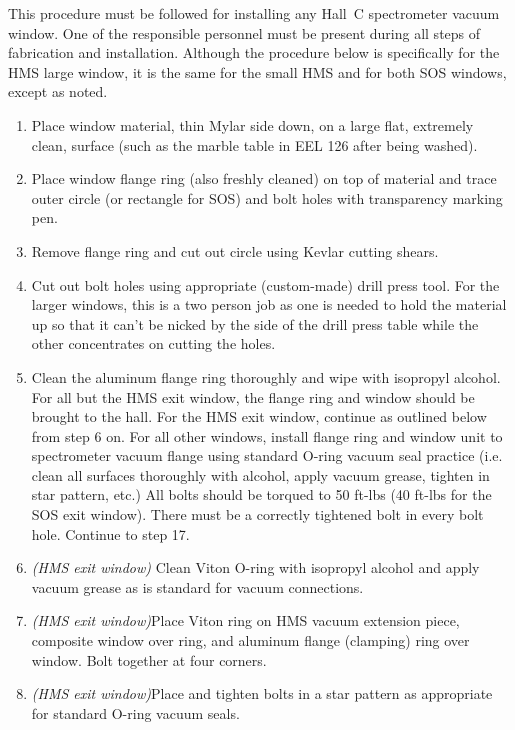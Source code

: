 {{This procedure must be followed for installing any Hall~C spectrometer
vacuum window. One of the responsible personnel must be present during
all steps of fabrication and installation.
Although the procedure below is specifically for
the HMS large window, it is the same for the small HMS and for both SOS windows,
except as noted.
\begin{enumerate}
\item{Place window material, thin Mylar side down,
on a large flat, extremely clean, surface (such as
the marble table in EEL 126 after being washed).}

\item{Place window flange ring (also freshly cleaned) on top of material
and trace outer
circle (or rectangle for SOS) and bolt holes with transparency marking
pen.}

\item{Remove flange ring and cut out circle using Kevlar cutting 
shears.}

\item{Cut out bolt holes using appropriate (custom-made) drill press tool.
For the larger windows, this is a two person job as one is needed to hold the
material up so that it can't be nicked by the side of the drill press table
while the other concentrates on cutting the holes.}

\item{Clean the aluminum flange ring thoroughly and wipe with isopropyl
alcohol. For all but the HMS exit window, the flange ring and
window should be brought to the hall.  For the HMS exit window,
continue as outlined below from step 6 on.  For all other windows,
install flange ring and window unit to spectrometer vacuum flange
using standard O-ring vacuum seal practice (i.e. clean all surfaces
thoroughly with alcohol, apply vacuum grease, tighten in star pattern,
etc.)  All bolts should be torqued to 50 ft-lbs (40 ft-lbs for the
SOS exit window).  There must be a correctly tightened bolt in every
bolt hole.  Continue to step 17.}

\item{{\sl (HMS exit window)} Clean Viton O-ring with isopropyl alcohol and apply vacuum
grease as is standard for vacuum connections.}

\item{{\sl (HMS exit window)}Place Viton ring on HMS vacuum extension piece, composite
window over ring, and aluminum flange (clamping) ring over window.   Bolt together at four corners.}

\item{{\sl (HMS exit window)}Place and tighten bolts in a star pattern as appropriate for
standard O-ring vacuum seals.}


\end{enumerate}}}

